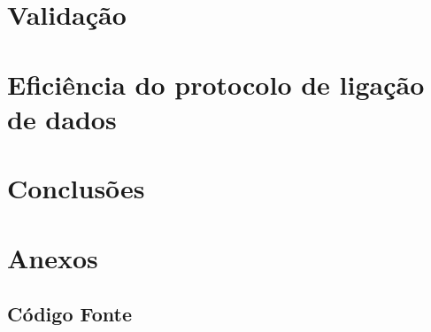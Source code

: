 \documentclass[a4paper,11pt,portuguese]{article}
\begin{document}


\section{Validação}



\section{Eficiência do protocolo de ligação de dados}



\section{Conclusões}



\newpage

\section{Anexos}
\subsection{Código Fonte}












\end{document}
